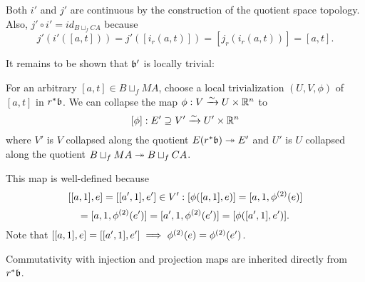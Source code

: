 \begin{myproof}
    Both $i'$ and $j'$ are continuous
    by the construction of the quotient space topology.
    Also, $j' \circ i' = id_{B \sqcup_f CA}$ because
    \[ j'(i'([a, t])) = j'([i_r(a, t)]) = [j_r(i_r(a, t))] = [a, t]. \]
    
    It remains to be shown that $\mathfrak{b}'$ is locally trivial:

    For an arbitrary $[a, t] \in B \sqcup_f MA$, choose a
    local trivialization $(U, V, \phi)$ of $[a, t]$ in $r^*\mathfrak{b}$.
    We can collapse the map $\phi: V \xrightarrow{\sim} U \times \mathbb{R}^n$ to
    \[ [\phi]: E' \supseteq{} V' \xrightarrow{\sim} U' \times \mathbb{R}^n \]
    where $V'$ is $V$ collapsed along the quotient
    $E(r^*\mathfrak{b}) \twoheadrightarrow{} E'$ and $U'$ is $U$ collapsed
    along the quotient $B \sqcup_f MA \twoheadrightarrow{} B \sqcup_f CA$.
    
    This map is well-defined because
    \[ [[a, 1], e] = [[a', 1], e'] \in V': [\phi([a, 1], e)] = [a, 1, \phi^{(2)}(e)] \]
    \[ = [a, 1, \phi^{(2)}(e')] = [a', 1, \phi^{(2)}(e')] = [\phi([a', 1], e')]. \]
    Note that $[[a, 1], e] = [[a', 1], e'] \implies \phi^{(2)}(e) = \phi^{(2)}(e')$.
    
    Commutativity with injection and projection maps
    are inherited directly from $r^*\mathfrak{b}$.
\end{myproof}